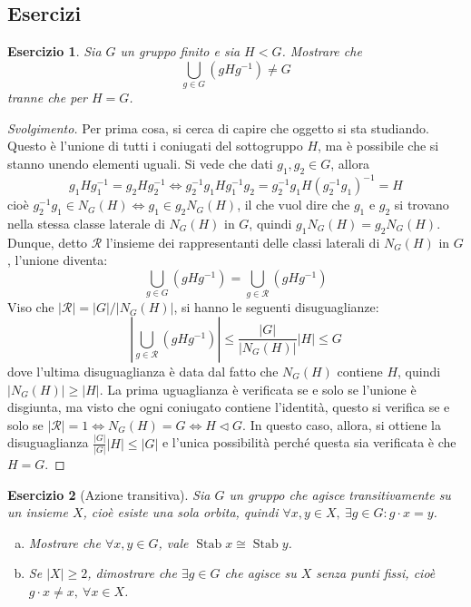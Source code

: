 \documentclass[11pt]{article}
\theoremstyle{style}
\newtheorem{esercizio}{Esercizio}[section]
\newenvironment{svolgimento}{\renewcommand\qedsymbol{$\blacksquare$}\begin{proof}[Svolgimento]}{\end{proof}}
\numberwithin{equation}{subsection}
\begin{document}
\subsection{Esercizi}
\begin{esercizio}\label{exdl2}
	Sia $G$ un gruppo finito e sia $H < G$. 
	Mostrare che 
	\[
	\bigcup_{g \in G} \left(g H g^{-1}\right) \neq G
	\] 
	tranne che per $H = G$.
\end{esercizio}
\begin{svolgimento}
	Per prima cosa, si cerca di capire che oggetto si sta studiando.
	Questo \`e l'unione di tutti i coniugati del sottogruppo $H$, ma \`e possibile che si stanno unendo elementi uguali. 
	Si vede che dati $g_1,g_2 \in G$, allora 
	\[
	g_1H g_1^{-1} = g_2Hg_2^{-1}\iff g_2^{-1}g_1H g_1^{-1} g_2 =g_2^{-1}g_1H(g_2^{-1}g_1)^{-1}=H 
	\] 
	cio\`e $g_2^{-1}g_1 \in N_G(H) \iff g_1 \in g_2N_G(H)$, il che vuol dire che $g_1$ e $g_2$ si trovano nella stessa classe laterale di $N_G(H)$ in $G$, quindi $g_1 N_G(H) = g_2N_G(H)$.
Dunque, detto $\mathcal{R} $ l'insieme dei rappresentanti delle classi laterali di $N_G(H)$ in $G$, l'unione diventa:
\[
	\bigcup_{g \in G} \left(g H g^{-1}\right)= \bigcup_{g \in \mathcal{R} } (gHg^{-1})
\] 
Viso che $\lvert \mathcal{R}  \rvert  = \lvert G \rvert / \lvert N_G(H) \rvert $, si hanno le seguenti disuguaglianze:
\[
\left\lvert \bigcup_{g \in  \mathcal{R} } (gHg^{-1}) \right\rvert \le \frac{\lvert G \rvert }{\lvert N_G(H) \rvert } \lvert H \rvert \le G
\] 
dove l'ultima disuguaglianza \`e data dal fatto che $N_G(H)$ contiene $H$, quindi $\lvert N_G(H)\rvert \ge \lvert H \rvert   $.
La prima uguaglianza \`e verificata se e solo se l'unione \`e disgiunta, ma visto che ogni coniugato contiene l'identit\`a, questo si verifica se e solo se $|\mathcal{R} |= 1\iff N_G(H) = G \iff H \lhd G$.
In questo caso, allora, si ottiene la disuguaglianza $\frac{\lvert G \rvert }{\lvert G \rvert } \lvert H \rvert \le \lvert G \rvert $ e l'unica possibilit\`a perch\'e questa sia verificata \`e che $H = G$.
\end{svolgimento}
\begin{esercizio}
	[Azione transitiva]
	Sia $G$ un gruppo che agisce transitivamente su un insieme $X$, cio\`e esiste una sola orbita, quindi $\forall x,y\in X, \ \exists g \in G : g \cdot x = y$.
	\begin{enumerate}[(a).]
		\item Mostrare che $\forall x,y \in G$, vale $\operatorname{Stab} x \cong \operatorname{Stab} y$.
		\item Se $\lvert X \rvert \ge 2$, dimostrare che $\exists g \in G$ che agisce su $X$ senza punti fissi, cio\`e $g \cdot x \neq x, \ \forall x \in X$.
	\end{enumerate}
\end{esercizio}
\end{document}
